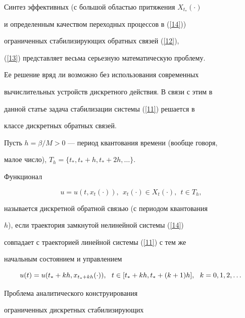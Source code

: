 Синтез эффективных (с большой областью притяжения $X_{t_*}(\cdot)$


и определенным качеством переходных процессов в (\ref{14}))


ограниченных стабилизирующих обратных связей (\ref{12}),


(\ref{13}) представляет весьма серьезную математическую проблему.


Ее решение вряд ли возможно без использования современных


вычислительных устройств дискретного действия. В связи с этим в


данной статье задача стабилизации системы (\ref{11}) решается в


классе дискретных обратных связей.





Пусть $h=\beta/M>0$ --- период квантования времени (вообще говоря,


малое число), $T_h=\{t_*, t_*+h, t_*+2h, \dotsc\}.$





\begin{defns}


Функционал


\begin{equation}\label{15}


u=u(t,x_t(\cdot)),\ \ x_t(\cdot) \in X_{t}(\cdot),\ \ t \in T_h,


\end{equation}


называется дискретной обратной связью (с периодом квантования


$h$), если траектория замкнутой нелинейной системы (\ref{14})


совпадает с траекторией линейной системы (\ref{11}) с тем же


начальным состоянием и управлением


$$


u(t)=u(t_*+kh, x_{t_*+kh}(\cdot)),\ \ t \in [t_*+kh, t_*+(k+1)h], \tts{[}


\ \ k=0,1,2,\dotsc


$$


\end{defns}





Проблема аналитического конструирования


ограниченных дискретных стабилизирующих



